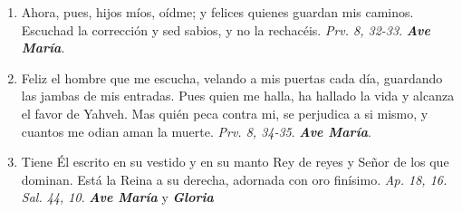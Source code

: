 \documentclass[../../devocionario.tex]{subfiles}
\begin{document}
\begin{enumerate}
        \item Ahora, pues, hijos míos, oídme; y felices quienes guardan mis caminos. 
            Escuchad la corrección y sed sabios, y no la rechacéis. \textit{Prv. 8, 32-33}. \textbf{\textit{Ave María}}.

        \item Feliz el hombre que me escucha, velando a mis puertas cada día, guardando las 
            jambas de mis entradas. Pues quien me halla, ha hallado la vida y alcanza el favor 
            de Yahveh. Mas quién peca contra mi, se perjudica a si mismo, y cuantos me odian aman la muerte. 
            \textit{Prv. 8, 34-35}. \textbf{\textit{Ave María}}.

        \item Tiene Él escrito en su vestido y en su manto Rey de reyes y Señor de los que dominan. 
            Está la Reina a su derecha, adornada con oro finísimo. \textit{Ap. 18, 16. Sal. 44, 10}. \textbf{\textit{Ave María}} y \textbf{\textit{Gloria}}

    \end{enumerate}
\end{document}
